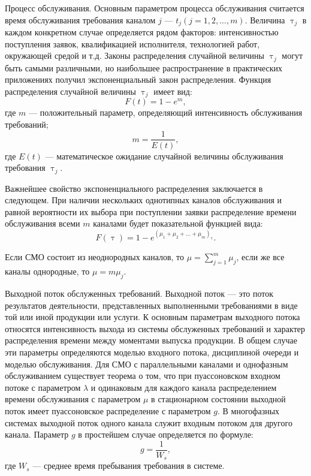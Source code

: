 Процесс обслуживания. Основным параметром процесса обслуживания считается время обслуживания требования каналом $j$ --- $t_j(j =1,2,...,m)$. Величина $\uptau_j$ в каждом конкретном случае определяется рядом факторов: интенсивностью поступления заявок, квалификацией исполнителя, технологией работ, окружающей средой и т.д. Законы распределения случайной величины $\uptau_j$ могут быть самыми различными, но наибольшее распространение в практических приложениях получил экспоненциальный закон распределения. Функция распределения случайной величины $\uptau_j$ имеет вид:
\begin{equation}\label{10-4}
F(t)=1-e^m,
\end{equation}
где $m$ --- положительный параметр, определяющий интенсивность обслуживания требований;
\begin{equation}\label{10-5}
m=\dfrac{1}{E(t)},
\end{equation}
где $E(t)$ --- математическое ожидание случайной величины обслуживания требования $\uptau_j$.

Важнейшее свойство экспоненциального распределения заключается в следующем. При наличии нескольких однотипных каналов обслуживания и равной вероятности их выбора при поступлении заявки распределение времени обслуживания всеми $m$ каналами будет показательной функцией вида:
\begin{equation}\label{10-6}
F(\uptau) = 1-e^{(\mu_1 +\mu_2 + ... + \mu_m)_{\uptau}}.
\end{equation}

Если СМО состоит из неоднородных каналов, то $\mu = \sum\limits_{j=1}^m\mu_j$, если же все каналы однородные, то $\mu = m \mu_j$.

Выходной поток обслуженных требований. Выходной поток — это поток результатов деятельности, представленных выполненными требованиями в виде той или иной продукции или услуги. К основным параметрам выходного потока относятся интенсивность выхода из системы обслуженных требований и характер распределения времени между моментами выпуска продукции. В общем случае эти параметры определяются моделью входного потока, дисциплиной очереди и моделью обслуживания. Для СМО с параллельными каналами и однофазным обслуживанием существует теорема о том, что при пуассоновском входном потоке с параметром $\lambda$ и одинаковым для каждого канала распределением времени обслуживания с параметром $\mu$ в стационарном состоянии выходной поток имеет пуассоновское распределение с параметром $g$. В многофазных системах выходной поток одного канала служит входным потоком для другого канала. Параметр $g$ в простейшем случае определяется по формуле:
\begin{equation}\label{10-7}
g=\dfrac{1}{W_s},
\end{equation}
где $W_s$ --- среднее время пребывания требования в системе.

